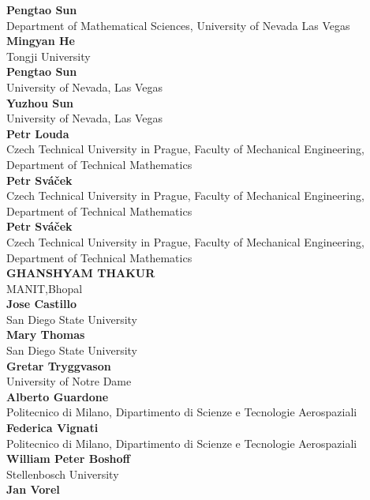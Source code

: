\documentclass[article,A4,11pt]{llncs}%
\begin{document}
        \noindent
    {\bf Pengtao Sun}\\
    Department of Mathematical Sciences, University of Nevada Las Vegas\\
        \noindent
    {\bf Mingyan He}\\
    Tongji University\\
        \noindent
    {\bf Pengtao Sun}\\
    University of Nevada, Las Vegas\\
        \noindent
    {\bf Yuzhou Sun}\\
    University of Nevada, Las Vegas\\
        \noindent
    {\bf Petr Louda}\\
    Czech Technical University in Prague, Faculty of Mechanical Engineering, Department of Technical Mathematics\\
        \noindent
    {\bf Petr Sváček}\\
    Czech Technical University in Prague, Faculty of Mechanical Engineering, Department of Technical Mathematics\\
        \noindent
    {\bf Petr Sváček}\\
    Czech Technical University in Prague, Faculty of Mechanical Engineering, Department of Technical Mathematics\\
        \noindent
    {\bf GHANSHYAM THAKUR}\\
    MANIT,Bhopal\\
        \noindent
    {\bf Jose Castillo}\\
    San Diego State University\\
        \noindent
    {\bf Mary Thomas}\\
    San Diego State University\\
        \noindent
    {\bf Gretar Tryggvason}\\
    University of Notre Dame\\
        \noindent
    {\bf Alberto Guardone}\\
    Politecnico di Milano, Dipartimento di Scienze e Tecnologie Aerospaziali\\
        \noindent
    {\bf Federica Vignati}\\
    Politecnico di Milano, Dipartimento di Scienze e Tecnologie Aerospaziali\\
        \noindent
    {\bf William Peter Boshoff}\\
    Stellenbosch University\\
        \noindent
    {\bf Jan Vorel}\\
\end{document}
